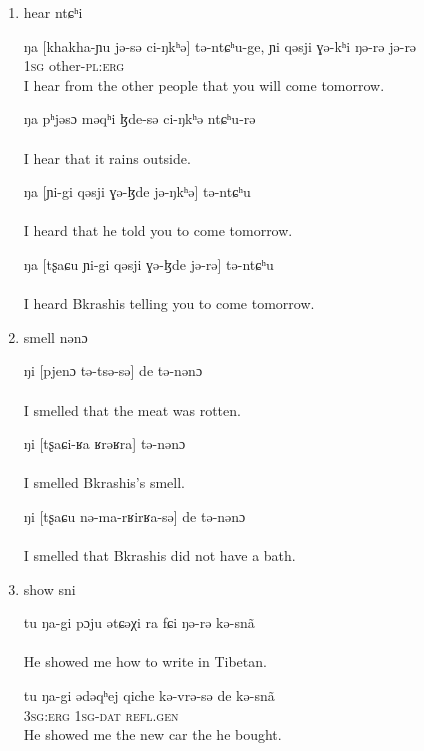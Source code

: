 \documentclass[oldfontcommands,oneside,a4paper,11pt]{article}
\newcommand{\ipa}[1]{{\phon #1}} %
\begin{document}
\begin{enumerate}
\item hear \ipa{ntɕʰi}
\begin{exe}
\ex
\gll ŋa [khakha-ɲu jə-sə ci-ŋkʰə] tə-ntɕʰu-ge, ɲi qəsji ɣə-kʰi ŋə-rə jə-rə    \\
\textsc{1sg} other-\textsc{pl:erg} \\
\glt  I hear from the other people that you will come tomorrow.
\end{exe}

\begin{exe}
\ex
\gll ŋa pʰjəsɔ məqʰi ɮde-sə ci-ŋkʰə ntɕʰu-rə    \\
\\
\glt  I hear that it rains outside.
\end{exe}

\begin{exe}
\ex
\gll ŋa [ɲi-gi qəsji ɣə-ɮde jə-ŋkʰə]   tə-ntɕʰu   \\
\\
\glt  I heard that he told you to come tomorrow.
\end{exe}

\begin{exe}
\ex
\gll ŋa [tʂaɕu ɲi-gi qəsji ɣə-ɮde jə-rə]   tə-ntɕʰu   \\
\\
\glt  I heard Bkrashis telling you to come tomorrow.
\end{exe}



\item smell \ipa{nənɔ}
\begin{exe}
\ex
\gll ŋi [pjenɔ tə-tsə-sə] de tə-nənɔ \\ %
\\
\glt  I smelled that the meat was rotten.
\end{exe}

 
\begin{exe}
\ex
\gll   ŋi [tʂaɕi-ʁa ʁrəʁra]   tə-nənɔ \\ %
\\
\glt  I smelled Bkrashis's smell.
\end{exe}

\begin{exe}
\ex
\gll    ŋi [tʂaɕu nə-ma-rʁirʁa-sə] de tə-nənɔ \\
\\
\glt  I smelled that Bkrashis did not have a bath.
\end{exe}

\item show \ipa{sni}
\begin{exe}
\ex
\gll    tu ŋa-gi pɔju ətɕəχi ra fɕi ŋə-rə kə-snã \\
\\
\glt  He showed me how to write in Tibetan.
\end{exe}
\begin{exe}
\ex
\gll    tu ŋa-gi ədəqʰej qiche kə-vrə-sə de kə-snã \\
\textsc{3sg:erg} \textsc{1sg-dat} \textsc{refl.gen}
\\
\glt  He showed me the new car the he bought.
\end{exe}


\end{enumerate}
\end{document}
